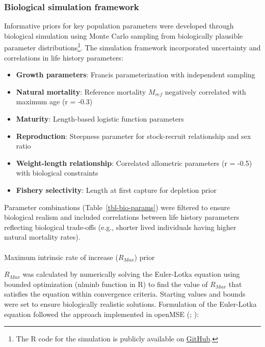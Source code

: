 \documentclass[
  11pt,
]{SCreport}
\makeatletter
\let\oldparagraph\paragraph
\renewcommand{\paragraph}{
    \@ifstar
      \xxxParagraphStar
      \xxxParagraphNoStar
  }
\newcommand{\xxxParagraphStar}[1]{\oldparagraph*{#1}\mbox{}}
\newcommand{\xxxParagraphNoStar}[1]{\oldparagraph{#1}\mbox{}}
\providecommand{\tightlist}{%
  \setlength{\itemsep}{0pt}\setlength{\parskip}{0pt}}\usepackage{longtable,booktabs,array}
\makeatother
\begin{document}
\subsubsection{Biological simulation
framework}\label{sec-biological-simulation}

Informative priors for key population parameters were developed through
biological simulation using Monte Carlo sampling from biologically
plausible parameter distributions\footnote{The R code for the simulation
   is publicly available on
  \href{https://github.com/N-DucharmeBarth-NOAA/2025-swpo-mls-bspm/blob/main/code/R/01-01-define-rmax-prior.r}{GitHub}.}.
The simulation framework incorporated uncertainty and correlations in
life history parameters:

\begin{itemize}
\tightlist
\item
  \textbf{Growth parameters}: Francis parameterization with independent
  sampling
\item
  \textbf{Natural mortality}: Reference mortality \(M_{ref}\) negatively
  correlated with maximum age (r = -0.3)
\item
  \textbf{Maturity}: Length-based logistic function parameters
\item
  \textbf{Reproduction}: Steepness parameter for stock-recruit
  relationship and sex ratio
\item
  \textbf{Weight-length relationship}: Correlated allometric parameters
  (r = -0.5) with biological constraints
\item
  \textbf{Fishery selectivity}: Length at first capture for depletion
  prior
\end{itemize}

Parameter combinations (Table~\ref{tbl-bio-params}) were filtered to
ensure biological realism and included correlations between life history
parameters reflecting biological trade-offs (e.g., shorter lived
individuals having higher natural mortality rates).

\paragraph{\texorpdfstring{Maximum intrinsic rate of increase
(\(R_{Max}\))
prior}{Maximum intrinsic rate of increase (R\_\{Max\}) prior}}\label{sec-rmax-prior}

\(R_{Max}\) was calculated by numerically solving the Euler-Lotka
equation using bounded optimization (nlminb function in R) to find the
value of \(R_{Max}\) that satisfies the equation within convergence
criteria. Starting values and bounds were set to ensure biologically
realistic solutions. Formulation of the Euler-Lotka equation followed
the approach implemented in openMSE
(;
):
\end{document}
